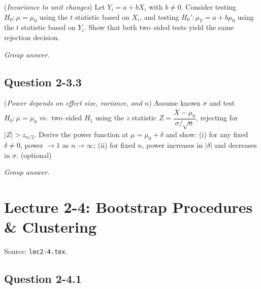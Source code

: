 \documentclass[11pt,letterpaper]{article}
\newenvironment{groupanswer}
  {\par\smallskip\noindent\textit{Group answer.}\par\nopagebreak\smallskip}
  {\par\medskip}
\begin{document}
\label{q:lec2-3-2}


(\emph{Invariance to unit changes})
Let $Y_i=a+bX_i$ with $b\neq0$. Consider testing $H_0:\mu=\mu_0$ using the $t$ statistic based on ${X_i}$, and testing $H_0':\mu_Y=a+b\mu_0$ using the $t$ statistic based on ${Y_i}$. Show that both two–sided tests yield the same rejection decision.


\begin{groupanswer}
\vspace{\baselineskip}
\end{groupanswer}


\subsection*{Question 2-3.3}

\label{q:lec2-3-3}


(\emph{Power depends on effect size, variance, and $n$})
Assume known $\sigma$ and test $H_0:\mu=\mu_0$ vs.\ two–sided $H_1$ using the $z$ statistic $Z=\dfrac{\overline{X}-\mu_0}{\sigma/\sqrt{n}}$, rejecting for $|Z|>z_{\alpha/2}$. Derive the power function at $\mu=\mu_0+\delta$ and show: (i) for any fixed $\delta\neq0$, power $\to1$ as $n\to\infty$; (ii) for fixed $n$, power increases in $|\delta|$ and decreases in $\sigma$. (optional)


\begin{groupanswer}
\vspace{\baselineskip}
\end{groupanswer}

\clearpage

\section*{Lecture 2-4: Bootstrap Procedures \& Clustering}

{\small Source: \texttt{lec2-4.tex}.}


\subsection*{Question 2-4.1}
\end{document}
